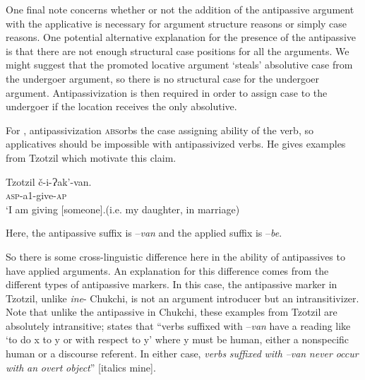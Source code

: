 \documentclass[output=paper,modfonts,nonflat,newtxmath]{langsci/langscibook}
\begin{document}
One final note concerns whether or not the addition of the antipassive argument with the applicative is necessary for argument structure reasons or simply case reasons. One potential alternative explanation for the presence of the antipassive is that there are not enough structural case positions for all the arguments. We might suggest that the promoted locative argument ‘steals’ absolutive case from the undergoer argument, so there is no structural case for the undergoer argument. Antipassivization is then required in order to assign case to the undergoer if the location receives the only absolutive. 

For \citet{Baker1988}, antipassivization \textsc{abs}orbs the case assigning ability of the verb, so applicatives should be impossible with antipassivized verbs. He gives examples from Tzotzil which motivate this claim.\textstyleEndnoteSymbol{} 

\ea%
    Tzotzil \citep{Aissen1983} \label{ex:basilico:15}
    \ea \label{ex:basilico:15a}
    \gll č-i-Ɂak’-van.\\
    \textsc{asp}{}-a1-give{}-\textsc{ap}\\
    \glt `I am giving [someone].(i.e. my daughter, in marriage)
    
    \z
    \z
    

Here, the antipassive suffix is –\textit{van} and the applied suffix is –\textit{be}.

So there is some cross-linguistic difference here in the ability of antipassives to have applied arguments. An explanation for this difference comes from the different types of antipassive markers. In this case, the antipassive marker in Tzotzil, unlike \textit{ine}{}- Chukchi, is not an argument introducer but an intransitivizer. Note that unlike the antipassive in Chukchi, these examples from Tzotzil are absolutely intransitive; \citet[291]{Aissen1983} states that “verbs suffixed with –\textit{van} have a reading like ‘to do x to y or with respect to y’ where y must be human, either a nonspecific human or a discourse referent. In either case, \textit{verbs} \textit{suffixed} \textit{with} \textit{–van} \textit{never} \textit{occur} \textit{with} \textit{an} \textit{overt} \textit{object}” [italics mine].
\end{document}

